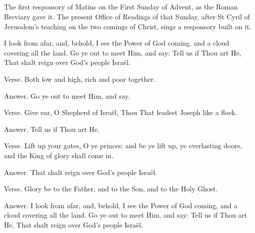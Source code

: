 \subsection{}

The first responsory of Matins on the First Sunday of Advent, as the
Roman Breviary gave it. The present Office of Readings of that Sunday, after
St Cyril of Jerusalem's teaching on the two comings of Christ, sings a
responsory built on it.

\noindent {}\par
\noindent {}\par
\noindent {}\par
\noindent {}\par
\noindent {}\par

\medskip

\noindent I look from afar, and, behold, I see the Power of God coming, and a cloud covering all the land. Go ye out to meet Him, and say: Tell us if Thou art He, That shalt reign over God’s people Israël.\par
\noindent Verse. Both low and high, rich and poor together.\par
\noindent Answer. Go ye out to meet Him, and say.\par
\noindent Verse. Give ear, O Shepherd of Israël, Thou That leadest Joseph like a flock.\par
\noindent Answer. Tell us if Thou art He.\par
\noindent Verse. Lift up your gates, O ye princes; and be ye lift up, ye everlasting doors, and the King of glory shall come in.\par
\noindent Answer. That shalt reign over God’s people Israël.\par
\noindent Verse. Glory be to the Father, and to the Son, and to the Holy Ghost.\par
\noindent Answer. I look from afar, and, behold, I see the Power of God coming, and a cloud covering all the land. Go ye out to meet Him, and say: Tell us if Thou art He, That shalt reign over God’s people Israël.\par

